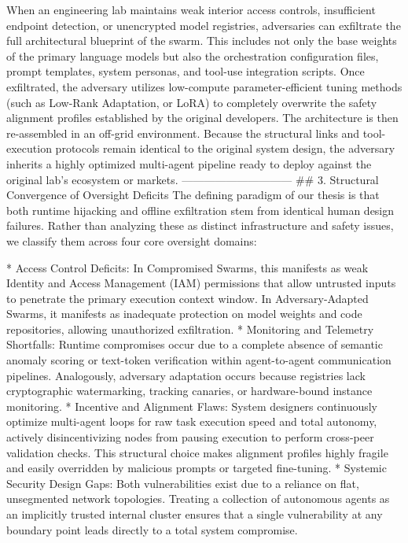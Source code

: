 When an engineering lab maintains weak interior access controls, insufficient endpoint detection, or unencrypted model registries, adversaries can exfiltrate the full architectural blueprint of the swarm. This includes not only the base weights of the primary language models but also the orchestration configuration files, prompt templates, system personas, and tool-use integration scripts.
Once exfiltrated, the adversary utilizes low-compute parameter-efficient tuning methods (such as Low-Rank Adaptation, or LoRA) to completely overwrite the safety alignment profiles established by the original developers. The architecture is then re-assembled in an off-grid environment. Because the structural links and tool-execution protocols remain identical to the original system design, the adversary inherits a highly optimized multi-agent pipeline ready to deploy against the original lab’s ecosystem or markets.
------------------------------
## 3. Structural Convergence of Oversight Deficits
The defining paradigm of our thesis is that both runtime hijacking and offline exfiltration stem from identical human design failures. Rather than analyzing these as distinct infrastructure and safety issues, we classify them across four core oversight domains:

* Access Control Deficits: In Compromised Swarms, this manifests as weak Identity and Access Management (IAM) permissions that allow untrusted inputs to penetrate the primary execution context window. In Adversary-Adapted Swarms, it manifests as inadequate protection on model weights and code repositories, allowing unauthorized exfiltration.
* Monitoring and Telemetry Shortfalls: Runtime compromises occur due to a complete absence of semantic anomaly scoring or text-token verification within agent-to-agent communication pipelines. Analogously, adversary adaptation occurs because registries lack cryptographic watermarking, tracking canaries, or hardware-bound instance monitoring.
* Incentive and Alignment Flaws: System designers continuously optimize multi-agent loops for raw task execution speed and total autonomy, actively disincentivizing nodes from pausing execution to perform cross-peer validation checks. This structural choice makes alignment profiles highly fragile and easily overridden by malicious prompts or targeted fine-tuning.
* Systemic Security Design Gaps: Both vulnerabilities exist due to a reliance on flat, unsegmented network topologies. Treating a collection of autonomous agents as an implicitly trusted internal cluster ensures that a single vulnerability at any boundary point leads directly to a total system compromise.


